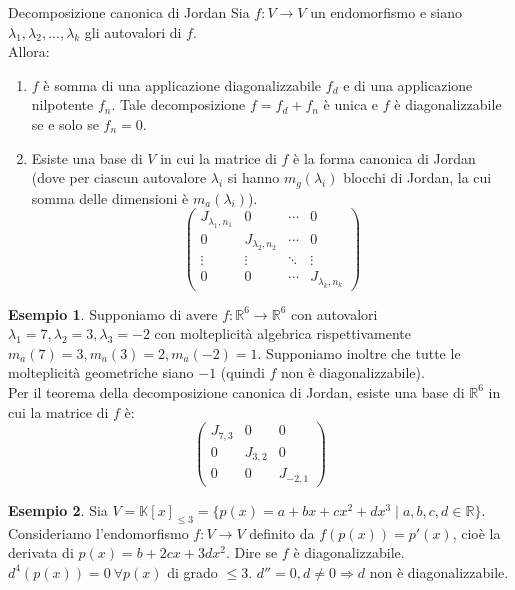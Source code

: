 \documentclass[a4paper]{article}
\theoremstyle{definition}
\newtheorem*{es}{Esempio}
\begin{document}
	\begin{teo}{Decomposizione canonica di Jordan}{}
		Sia $f: V \to V$ un endomorfismo e siano $\lambda_1, \lambda_2, ..., \lambda_k$ gli autovalori di $f$. \\
		Allora: \\
		\begin{enumerate}
			\item $f$ è somma di una applicazione diagonalizzabile $f_d$ e di una applicazione nilpotente $f_n$.
			Tale decomposizione $f = f_d + f_n$ è unica e $f$ è diagonalizzabile se e solo se $f_n = 0$.
			\item Esiste una base di $V$ in cui la matrice di $f$ è la forma canonica di Jordan
			(dove per ciascun autovalore $\lambda_i$ si hanno $m_g(\lambda_i)$ blocchi di Jordan, la cui somma delle dimensioni è $m_a(\lambda_i)$).
			\begin{equation*}
				\begin{pmatrix}
					J_{\lambda_1, n_1} & 0 & \cdots & 0 \\
					0 & J_{\lambda_2, n_2} & \cdots & 0 \\
					\vdots & \vdots & \ddots & \vdots \\
					0 & 0 & \cdots & J_{\lambda_k, n_k}
				\end{pmatrix}
			\end{equation*}
		\end{enumerate}
	\end{teo}

	\begin{es}
		Supponiamo di avere $f: \mathbb{R}^6 \to \mathbb{R}^6$ con autovalori $\lambda_1 = 7, \lambda_2 = 3, \lambda_3 = -2$ con
		molteplicità algebrica rispettivamente $m_a(7) = 3, m_a(3) = 2, m_a(-2) = 1$.
		Supponiamo inoltre che tutte le molteplicità geometriche siano $-1$ (quindi $f$ non è diagonalizzabile). \\
		Per il teorema della decomposizione canonica di Jordan, esiste una base di $\mathbb{R}^6$ in cui la matrice di $f$ è:
		\begin{equation*}
			\begin{pmatrix}
				J_{7,3} & 0 & 0 \\
				0 & J_{3,2} & 0 \\
				0 & 0 & J_{-2,1}
			\end{pmatrix}
		\end{equation*}
	\end{es}

	\begin{es}
		Sia $V = \mathbb{K}[x]_{\le 3} = \{p(x) = a + bx + cx^2 + dx^3 \mid a, b, c, d \in \mathbb{R}\}$.
		Consideriamo l'endomorfismo $f: V \to V$ definito da $f(p(x)) = p'(x)$, cioè la derivata di $p(x) = b + 2cx + 3dx^2$.
		Dire se $f$ è diagonalizzabile.
		$d^4(p(x)) = 0 \ \forall p(x)$ di grado $\le 3$. $d'' = 0, d \ne 0 \Rightarrow d$ non è diagonalizzabile.
	\end{es}
\end{document}
